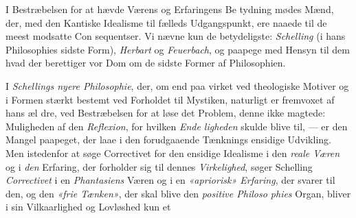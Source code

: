 I Bestræbelsen for at hævde Værens og Erfaringens Be\-%
tydning mødes Mænd, der, med den Kantiske Idealisme til
fælleds Udgangspunkt, ere naaede til de meest modsatte Con\-%
sequentser. Vi nævne kun de betydeligste: \emph{Schelling} (i
hans Philosophies sidste Form), \emph{Herbart} og \emph{Feuerbach}, og
paapege med Hensyn til dem hvad der berettiger vor Dom om
de sidste Former af Philosophien.

I \emph{Schellings nyere Philosophie}, der, om end paa\-%
virket ved theologiske Motiver og i Formen stærkt bestemt
ved Forholdet til Mystiken, naturligt er fremvoxet af hans æl\-%
dre, ved Bestræbelsen for at løse det Problem, denne ikke
magtede: Muligheden af den \emph{Reflexion}, for hvilken \emph{Ende\-%
ligheden} skulde blive til, --- er den Mangel paapeget, der
laae i den forudgaaende Tænknings ensidige Udvikling. Men
istedenfor at søge Correctivet for den ensidige Idealisme i den
\emph{reale Væren} og i \emph{den} Erfaring, der forholder sig til dennes
\emph{Virkelighed}, søger Schelling \emph{Correctivet} i en \emph{Phantasiens}
Væren og i en \emph{«apriorisk» Erfaring}, der svarer til den, og
den \emph{«frie Tænken»}, der skal blive den \emph{positive Philoso\-%
phies} Organ, bliver i sin Vilkaarlighed og Lovløshed kun et
